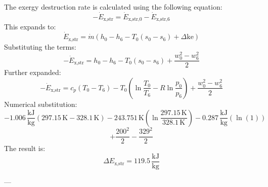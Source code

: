 The exergy destruction rate is calculated using the following equation:  
\[
-\dot{E}_{\text{x,str}} = \dot{E}_{\text{x,str,0}} - \dot{E}_{\text{x,str,6}}
\]  
This expands to:  
\[
\dot{E}_{\text{x,str}} = \dot{m} \left( h_0 - h_6 - T_0 \left( s_0 - s_6 \right) + \Delta \text{ke} \right)
\]  
Substituting the terms:  
\[
-\dot{E}_{\text{x,str}} = h_0 - h_6 - T_0 \left( s_0 - s_6 \right) + \frac{w_0^2 - w_6^2}{2}
\]  
Further expanded:  
\[
-\dot{E}_{\text{x,str}} = c_p \left( T_0 - T_6 \right) - T_0 \left( \ln \frac{T_0}{T_6} - R \ln \frac{p_0}{p_6} \right) + \frac{w_0^2 - w_6^2}{2}
\]  
Numerical substitution:  
\[
-1.006 \, \frac{\text{kJ}}{\text{kg}} \left( 297.15 \, \text{K} - 328.1 \, \text{K} \right) - 243.751 \, \text{K} \left( \ln \frac{297.15 \, \text{K}}{328.1 \, \text{K}} \right) - 0.287 \, \frac{\text{kJ}}{\text{kg}} \left( \ln(1) \right)
\]  
\[
+ \frac{200^2}{2} - \frac{329^2}{2}
\]  
The result is:  
\[
\Delta E_{\text{x,str}} = 119.5 \, \frac{\text{kJ}}{\text{kg}}
\]  

---